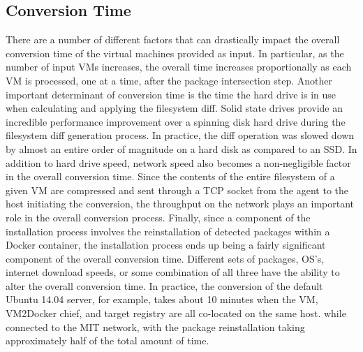 \subsection{Conversion Time}
There are a number of different factors that can drastically impact the overall conversion time of the virtual machines provided as input. In particular, as the number of input VMs increases, the overall time increases proportionally as each VM is processed, one at a time, after the package intersection step. Another important determinant of conversion time is the time the hard drive is in use when calculating and applying the filesystem diff. Solid state drives provide an incredible performance improvement over a spinning disk hard drive during the filesystem diff generation process. In practice, the diff operation was slowed down by almost an entire order of magnitude on a hard disk as compared to an SSD. In addition to hard drive speed, network speed also becomes a non-negligible factor in the overall conversion time. Since the contents of the entire filesystem of a given VM are compressed and sent through a TCP socket from the agent to the host initiating the conversion, the throughput on the network plays an important role in the overall conversion process. Finally, since a component of the installation process involves the reinstallation of detected packages within a Docker container, the installation process ends up being a fairly significant component of the overall conversion time. Different sets of packages, OS's, internet download speeds, or some combination of all three have the ability to alter the overall conversion time. In practice, the conversion of the default Ubuntu 14.04 server, for example, takes about 10 minutes when the VM, VM2Docker chief, and target registry are all co-located on the same host. while connected to the MIT network, with the package reinstallation taking approximately half of the total amount of time.




